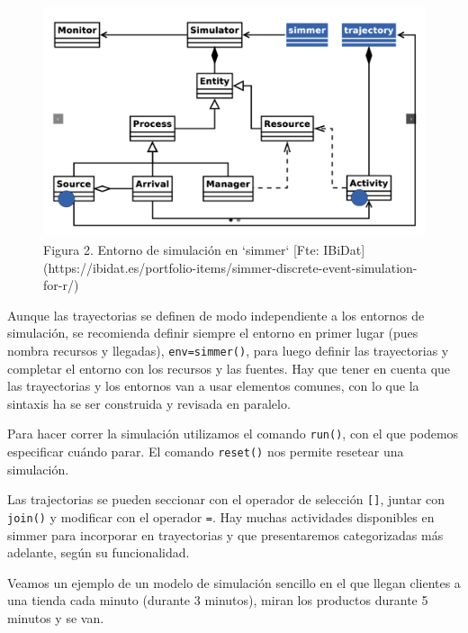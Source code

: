 \documentclass[
]{book}
\theoremstyle{definition}
\theoremstyle{definition}
\theoremstyle{definition}
\theoremstyle{definition}
\theoremstyle{remark}
\begin{document}
\begin{figure}

{\centering \includegraphics[width=0.8\linewidth]{images/simmer_entorno} 

}

\caption{Figura 2. Entorno de simulación en `simmer` [Fte: IBiDat](https://ibidat.es/portfolio-items/simmer-discrete-event-simulation-for-r/)}\label{fig:simmerentorno}
\end{figure}

Aunque las trayectorias se definen de modo independiente a los entornos de simulación, se recomienda definir siempre el entorno en primer lugar (pues nombra recursos y llegadas), \texttt{env=simmer()}, para luego definir las trayectorias y completar el entorno con los recursos y las fuentes. Hay que tener en cuenta que las trayectorias y los entornos van a usar elementos comunes, con lo que la sintaxis ha se ser construida y revisada en paralelo.

Para hacer correr la simulación utilizamos el comando \texttt{run()}, con el que podemos especificar cuándo parar. El comando \texttt{reset()} nos permite resetear una simulación.

Las trajectorias se pueden seccionar con el operador de selección \texttt{{[}{]}}, juntar con \texttt{join()} y modificar con el operador \texttt{=}. Hay muchas actividades disponibles en simmer para incorporar en trayectorias y que presentaremos categorizadas más adelante, según su funcionalidad.

Veamos un ejemplo de un modelo de simulación sencillo en el que llegan clientes a una tienda cada minuto (durante 3 minutos), miran los productos durante 5 minutos y se van.
\end{document}
